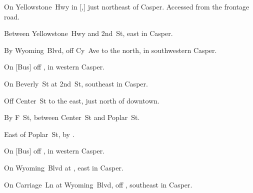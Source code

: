 
\begin{LocationList}

On Yellowstone~Hwy in [,] just northeast of Casper.
Accessed from the frontage road.

\Location{\GarageHQ \Garage}
Between Yellowstone~Hwy and 2nd~St, east in Casper.

By Wyoming~Blvd, off  Cy~Ave to the north, in southwestern Casper.

On [Bus] off  , in western Casper.

On Beverly~St at 2nd~St, southeast in Casper.

Off Center~St to the east, just north of downtown.

\Location{\RecruitmentAgency \Recruitment}
By F~St, between Center~St and Poplar~St.

East of  Poplar~St, by  .

On [Bus] off  , in western Casper.

\Location{\TruckStop \Gas \Rest \Weigh}
On Wyoming~Blvd at  , east in Casper.

On Carriage~Ln at Wyoming~Blvd, off  , southeast in Casper.

\end{LocationList}
